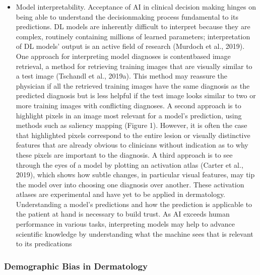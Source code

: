 \documentclass[12pt, a4paper, oneside]{book}   	%
\begin{document}
\begin{itemize}
				\item Model interpretability. Acceptance of AI in clinical decision making hinges on being able to understand the decisionmaking process fundamental to its predictions. DL models are inherently difficult to interpret because they are complex, routinely containing millions of learned parameters; interpretation of DL models’ output is an active field of research (Murdoch et al., 2019). One approach for interpreting model diagnoses is contentbased image retrieval, a method for retrieving training images that are visually similar to a test image (Tschandl et al., 2019a). This method may reassure the physician if all the retrieved training images have the same diagnosis as the predicted diagnosis but is less helpful if the test image looks similar to two or more training images with conflicting diagnoses. A second approach is to highlight pixels in an image most relevant for a model’s prediction, using methods such as saliency mapping (Figure 1). However, it is often the case that highlighted pixels correspond to the entire lesion or visually distinctive features that are already obvious to clinicians without indication as to why these pixels are important to the diagnosis. A third approach is to see through the eyes of a model by plotting an activation atlas (Carter et al., 2019), which shows how subtle changes, in particular visual features, may tip the model over into choosing one diagnosis over another. These activation atlases are experimental and have yet to be applied in dermatology. Understanding a model’s predictions and how the prediction is applicable to the patient at hand is necessary to build trust. As AI exceeds human performance in various tasks, interpreting models may help to advance scientific knowledge by understanding what the machine sees that is relevant to its predications \autocite{Young_2020}
			\end{itemize}
		\subsubsection{Demographic Bias in Dermatology}
\end{document}
